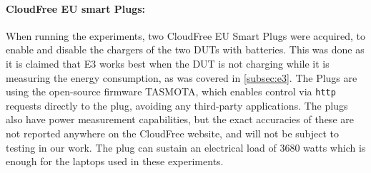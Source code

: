 \paragraph*{CloudFree EU smart Plugs:}

When running the experiments, two CloudFree EU Smart Plugs\cite{CloudFreeEUSMartPlug} were acquired, to enable and disable the chargers of the two DUTs with batteries. This was done as it is claimed that E3 works best when the DUT is not charging while it is measuring the energy consumption, as was covered in \cref{subsec:e3}. The Plugs are using the open-source firmware TASMOTA\cite{TomatoGit}, which enables control via \texttt{http} requests directly to the plug, avoiding any third-party applications. The plugs also have power measurement capabilities, but the exact accuracies of these are not reported anywhere on the CloudFree website, and will not be subject to testing in our work. The plug can sustain an electrical load of 3680 watts which is enough for the laptops used in these experiments.\cite{CloudFreeEUSMartPlug}